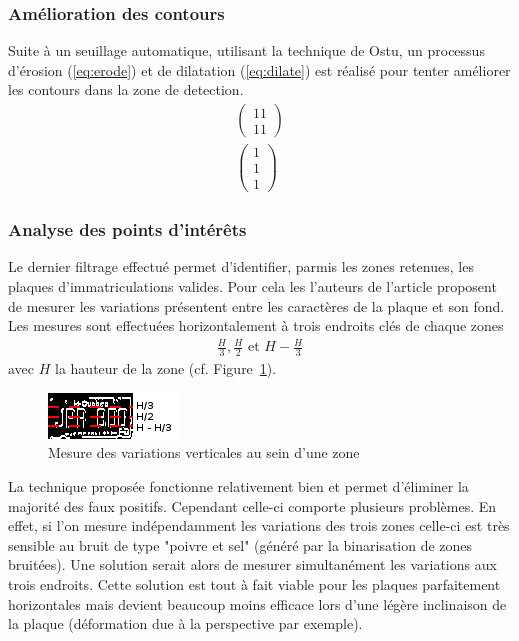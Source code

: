 \documentclass[a4paper,10pt,twocolumn]{article}
\begin{document}
\subsubsection{Amélioration des contours}
Suite à un seuillage automatique, utilisant la technique de Ostu\cite{otsu79}, un processus d'érosion (\ref{eq:erode}) et de dilatation (\ref{eq:dilate}) est réalisé pour tenter améliorer les contours dans la zone de detection.
\begin{gather}
  \label{eq:erode}
  \left( \begin{array}{c} 
    1 1\\
    1 1
  \end{array} \right)\\
  \label{eq:dilate}
  \left( \begin{array}{c} 
    1\\
    1\\
    1 
  \end{array} \right)
\end{gather}

\subsubsection{Analyse des points d'intérêts}
Le dernier filtrage effectué permet d'identifier, parmis les zones retenues, les plaques d'immatriculations valides. Pour cela les l'auteurs de l'article proposent de mesurer les variations présentent entre les caractères de la plaque et son fond. Les mesures sont effectuées horizontalement à trois endroits clés de chaque zones
\begin{align*}
  \frac{H}{3}, \frac{H}{2}\text{ et }H - \frac{H}{3}
\end{align*}
avec $H$ la hauteur de la zone (cf. Figure~\ref{plate_bin}).
\begin{figure}[H]
	\centering 
	  \includegraphics{img/plate_bin.png}
	\caption{Mesure des variations verticales au sein d'une zone\label{plate_bin}}
\end{figure}
La technique proposée fonctionne relativement bien et permet d'éliminer la majorité des faux positifs. Cependant celle-ci comporte plusieurs problèmes. En effet, si l'on mesure indépendamment les variations des trois zones celle-ci est très sensible au bruit de type "poivre et sel" (généré par la binarisation de zones bruitées). Une solution serait alors de mesurer simultanément les variations aux trois endroits. Cette solution est tout à fait viable pour les plaques parfaitement horizontales mais devient beaucoup moins efficace lors d'une légère inclinaison de la plaque (déformation due à la perspective par exemple). 
\end{document}
